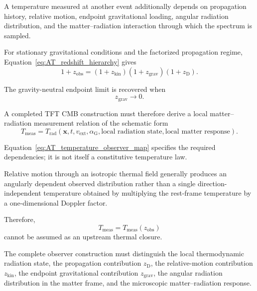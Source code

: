 A temperature measured at another event additionally depends on propagation
history, relative motion, endpoint gravitational loading, angular radiation
distribution, and the matter--radiation interaction through which the
spectrum is sampled.

For stationary gravitational conditions and the factorized propagation
regime, Equation~\eqref{eq:AT_redshift_hierarchy} gives
\begin{equation}
    \boxed{
    1+z_{\mathrm{obs}}
    =
    (1+z_{\mathrm{kin}})
    (1+z_{\mathrm{grav}})
    (1+z_{\mathrm D}).
    }
\end{equation}

The gravity-neutral endpoint limit is recovered when
\begin{equation}
    z_{\mathrm{grav}}
    \rightarrow
    0.
\end{equation}

A completed TFT CMB construction must therefore derive a local
matter--radiation measurement relation of the schematic form
\begin{equation}
    T_{\mathrm{meas}}
    =
    T_{\mathrm{rad}}
    \left(
        \mathbf{x},
        t,
        v_{\mathrm{ext}},
        \alpha_{\mathrm G},
        \text{local radiation state},
        \text{local matter response}
    \right).
    \label{eq:AT_temperature_observer_map}
\end{equation}

Equation~\eqref{eq:AT_temperature_observer_map}
specifies the required dependencies; it is not itself a constitutive
temperature law.

Relative motion through an isotropic thermal field generally produces an
angularly dependent observed distribution rather than a single
direction-independent temperature obtained by multiplying the rest-frame
temperature by a one-dimensional Doppler factor.

Therefore,
\begin{equation}
    T_{\mathrm{meas}}
    =
    T_{\mathrm{meas}}
    \left(
        z_{\mathrm{obs}}
    \right)
\end{equation}
cannot be assumed as an upstream thermal closure.

The complete observer construction must distinguish the local thermodynamic
radiation state, the propagation contribution
\(z_{\mathrm D}\),
the relative-motion contribution
\(z_{\mathrm{kin}}\),
the endpoint gravitational contribution
\(z_{\mathrm{grav}}\),
the angular radiation distribution in the matter frame, and the microscopic
matter--radiation response.

